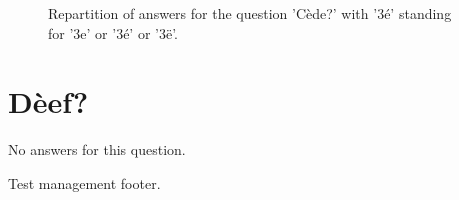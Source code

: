 \documentclass[11pt]{article}
\begin{document}
\begin{figure}[h!]
    \caption{\label{figure:q11-1}Repartition of answers for the question 'Cède?' with '3é' standing for '3e' or '3é' or '3ë'.}
\end{figure}



\clearpage{}
\section{Dèef?}

\label{sec:12}

No answers for this question.

Test management footer.
\end{document}
